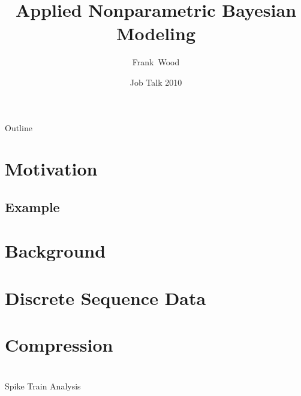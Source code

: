 \documentclass{beamer}
\title[Applied Nonparametric Bayesian Modeling] 
{
  Applied Nonparametric Bayesian Modeling
}
\author[Wood]
{
  Frank~Wood%
}
\institute[Columbia University]
{
  Columbia University
}
\date[Job Talk 2010]
{Job Talk 2010}
\begin{document}

\begin{frame}
  \titlepage
\end{frame}

\begin{frame}{Outline}
  \tableofcontents
\end{frame}

\section{Motivation}
\subsection{Example}
\section{Background}
\section{Discrete Sequence Data}
\section{Compression}
\section{}

\begin{frame}{Spike Train Analysis}
\end{frame}
	
\end{document}
